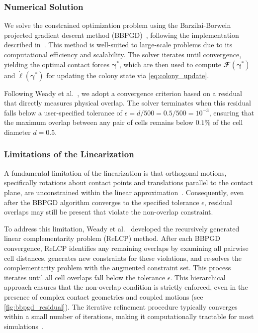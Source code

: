 \documentclass[conference]{IEEEtran}
\begin{document}
\subsubsection{Numerical Solution}

We solve the constrained optimization problem using the Barzilai-Borwein projected gradient descent method (BBPGD)~\cite{BBPGD}, following the implementation described in~\cite{Weady2024SM,Yan2019}. This method is well-suited to large-scale problems due to its computational efficiency and scalability. The solver iterates until convergence, yielding the optimal contact forces $\boldsymbol{\gamma}^*$, which are then used to compute $\mathbfcal{F}(\boldsymbol{\gamma}^*)$ and $\dot{\boldsymbol{\ell}}(\boldsymbol{\gamma}^*)$ for updating the colony state via \autoref{eq:colony_update}.

Following Weady et al.~\cite{Weady2024SM}, we adopt a convergence criterion based on a residual that directly measures physical overlap. The solver terminates when this residual falls below a user-specified tolerance of $\epsilon = d/500 = 0.5/500 = 10^{-3}$, ensuring that the maximum overlap between any pair of cells remains below $0.1\%$ of the cell diameter $d = 0.5$.

\subsubsection{Limitations of the Linearization}

A fundamental limitation of the linearization is that orthogonal motions, specifically rotations about contact points and translations parallel to the contact plane, are unconstrained within the linear approximation~\cite{Weady2024SM}. Consequently, even after the BBPGD algorithm converges to the specified tolerance $\epsilon$, residual overlaps may still be present that violate the non-overlap constraint.

To address this limitation, Weady et al.~\cite{Weady2024SM} developed the recursively generated linear complementarity problem (ReLCP) method. After each BBPGD convergence, ReLCP identifies any remaining overlaps by examining all pairwise cell distances, generates new constraints for these violations, and re-solves the complementarity problem with the augmented constraint set. This process iterates until all cell overlaps fall below the tolerance $\epsilon$. This hierarchical approach ensures that the non-overlap condition is strictly enforced, even in the presence of complex contact geometries and coupled motions (see \autoref{fig:bbpgd_residual}). The iterative refinement procedure typically converges within a small number of iterations, making it computationally tractable for most simulations~\cite{Weady2024SM}.
\end{document}
